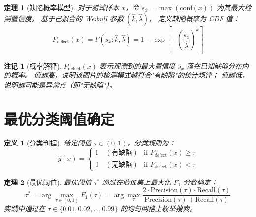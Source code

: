 \documentclass[12pt, a4paper]{ctexart}
\newtheorem{definition}{定义}[section]
\newtheorem{theorem}{定理}[section]
\newtheorem{remark}{注记}[section]
\begin{document}
\begin{theorem}[缺陷概率模型]
\label{thm:defect_prob}
对于测试样本 $x$，令 $s_x = \max(\mathrm{conf}(x))$ 为其最大检测置信度。
基于已拟合的 Weibull 参数 $(\hat{k}, \hat{\lambda})$，
定义缺陷概率为 CDF 值：
\begin{equation}
    \boxed{
    P_{\text{defect}}(x) = F(s_x; \hat{k}, \hat{\lambda})
    = 1 - \exp\!\left[-\left(\frac{s_x}{\hat{\lambda}}\right)^{\hat{k}}\right]
    }
    \label{eq:defect_prob}
\end{equation}
\end{theorem}

\begin{remark}[概率解释]
$P_{\text{defect}}(x)$ 表示观测到的最大置信度 $s_x$ 落在已知缺陷分布内的概率。
值越高，说明该图片的检测模式越符合"有缺陷"的统计规律；
值越低，说明越可能是异常点（即"无缺陷"）。
\end{remark}

\section{最优分类阈值确定}

\begin{definition}[分类判据]
给定阈值 $\tau \in (0, 1)$，分类规则为：
\begin{equation}
    \hat{y}(x) = \begin{cases}
    1 \quad (\text{有缺陷}) & \text{if } P_{\text{defect}}(x) \geq \tau \\
    0 \quad (\text{无缺陷}) & \text{if } P_{\text{defect}}(x) < \tau
    \end{cases}
    \label{eq:classification_rule}
\end{equation}
\end{definition}

\begin{theorem}[最优阈值]
最优阈值 $\tau^*$ 通过在验证集上最大化 $F_1$ 分数确定：
\begin{equation}
    \tau^* = \arg\max_{\tau \in (0,1)} F_1(\tau)
    = \arg\max_{\tau} \frac{2 \cdot \mathrm{Precision}(\tau) \cdot \mathrm{Recall}(\tau)}
    {\mathrm{Precision}(\tau) + \mathrm{Recall}(\tau)}
    \label{eq:optimal_threshold}
\end{equation}
实践中通过在 $\tau \in \{0.01, 0.02, \ldots, 0.99\}$ 的均匀网格上枚举搜索。
\end{theorem}
\end{document}
